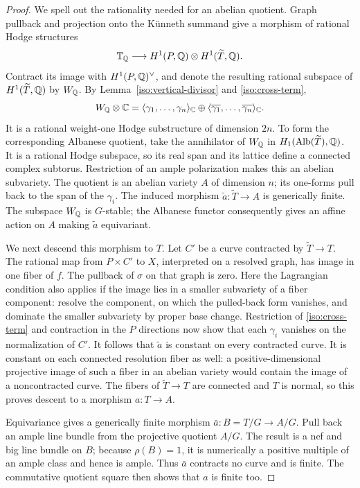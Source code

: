 \begin{proof}
We spell out the rationality needed for an abelian quotient.
Graph pullback and projection onto the K\"unneth summand give a
morphism of rational Hodge structures
\[
 \mathbb T_{\mathbb Q}\longrightarrow
 H^1(P,\mathbb Q)\otimes H^1(\widetilde T,\mathbb Q).
\]
Contract its image with \(H^1(P,\mathbb Q)^\vee\), and denote the resulting
rational subspace of \(H^1(\widetilde T,\mathbb Q)\) by \(W_{\mathbb Q}\).
By Lemma~\ref{iso:vertical-divisor} and
\eqref{iso:cross-term},
\[
 W_{\mathbb Q}\otimes\mathbb C
   =\langle\gamma_1,\ldots,\gamma_n\rangle_{\mathbb C}
       \oplus
     \langle\overline{\gamma_1},\ldots,
                 \overline{\gamma_n}\rangle_{\mathbb C}.
\]
It is a rational weight-one Hodge substructure of dimension \(2n\).
To form the corresponding Albanese quotient, take the annihilator
of \(W_{\mathbb Q}\) in
\(H_1(\operatorname{Alb}(\widetilde T),\mathbb Q)\).
It is a rational Hodge subspace, so its real span and its lattice
define a connected complex subtorus.  Restriction of an ample
polarization makes this an abelian subvariety.
The quotient is an abelian variety \(A\) of dimension \(n\);
its one-forms pull back to the span of the \(\gamma_i\).
The induced morphism
\(\widetilde a:\widetilde T\to A\) is generically finite.
The subspace \(W_{\mathbb Q}\) is \(G\)-stable; the Albanese functor consequently
gives an affine action on \(A\) making \(\widetilde a\) equivariant.

We next descend this morphism to \(T\).
Let \(C'\) be a curve contracted by \(\widetilde T\to T\).
The rational map from \(P\times C'\) to \(X\), interpreted on a resolved
graph, has image in one fiber of \(f\).
The pullback of \(\sigma\) on that graph is zero.  Here the Lagrangian
condition also applies if the image lies in a smaller subvariety of a
fiber component: resolve the component, on which the pulled-back form
vanishes, and dominate the smaller subvariety by proper base change.
Restriction of \eqref{iso:cross-term} and contraction in the \(P\)
directions now show that each \(\gamma_i\) vanishes on the normalization
of \(C'\).  It follows that \(\widetilde a\) is constant on every
contracted curve.  It is constant on each connected resolution fiber
as well: a positive-dimensional projective image of such a fiber in
an abelian variety would contain the image of a noncontracted curve.
The fibers of \(\widetilde T\to T\) are connected and \(T\) is normal,
so this proves descent to a morphism \(a:T\to A\).

Equivariance gives a generically finite morphism
\(\bar a:B=T/G\to A/G\).
Pull back an ample line bundle from the projective quotient \(A/G\).
The result is a nef and big line bundle on \(B\); because
\(\rho(B)=1\), it is numerically a positive multiple of an ample
class and hence is ample.  Thus \(\bar a\) contracts no curve and is
finite.  The commutative quotient square then shows that \(a\) is
finite too.


\end{proof}
